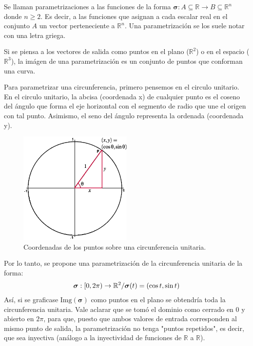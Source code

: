 \begin{definition}[Parametrización]
    Se llaman parametrizaciones a las funciones de la forma $\boldsymbol{\sigma}:A\subseteq\mathbb{R}\rightarrow B\subseteq\mathbb{R}^n$
    donde $n\geq2$. Es decir, a las funciones que asignan a cada escalar real en el conjunto $A$
    un vector perteneciente a $\mathbb{R}^n$.
    Una parametrización se los suele notar con una letra griega.

    Si se piensa a los vectores de salida como puntos en el plano ($\mathbb{R}^2$) o en el espacio ($\mathbb{R}^3$),
    la imágen de una parametrización es un conjunto de puntos que conforman una curva.

    \begin{example}
        Para parametrizar una circunferencia, primero pensemos en el circulo unitario.
        En el circulo unitario, la abcisa (coordenada x) de cualquier punto es el coseno del ángulo que forma el eje horizontal con el segmento de radio
        que une el origen con tal punto. Asimismo, el seno del ángulo representa la ordenada (coordenada y).
        \begin{figure}[H] 
            \centering
            \includegraphics[width=0.5\textwidth]{../figs/unitCircle1.png} %
            \caption{Coordenadas de los puntos sobre una circunferencia unitaria.}
            \label{fig:unitCircle1} %
        \end{figure}
        Por lo tanto, se propone una parametrización de la circunferencia unitaria de la forma:
        \begin{equation*}
            \boldsymbol{\sigma}:[0,2\pi)\rightarrow\mathbb{R}^2/ \\ \boldsymbol{\sigma}(t)=(\cos{t},\sin{t})
        \end{equation*}
        Así, si se graficase $\text{Img}(\boldsymbol{\sigma})$ como puntos en el plano se obtendría toda la circunferencia unitaria.
        Vale aclarar que se tomó el dominio como cerrado en $0$ y abierto en $2\pi$, para que, puesto que ambos valores de 
        entrada corresponden al mismo punto de salida, la parametrización no tenga "puntos repetidos", es decir, que sea inyectiva 
        (análogo a la inyectividad de funciones de $\mathbb{R}$ a $\mathbb{R}$).


\end{example}
\end{definition}
